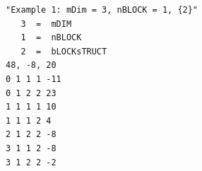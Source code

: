 \begin{center}
\begin{minipage}{0.72\textwidth}
\begin{verbatim}
"Example 1: mDim = 3, nBLOCK = 1, {2}"
   3  =  mDIM
   1  =  nBLOCK
   2  =  bLOCKsTRUCT
48, -8, 20
0 1 1 1 -11
0 1 2 2 23
1 1 1 1 10
1 1 1 2 4
2 1 2 2 -8
3 1 1 2 -8
3 1 2 2 -2
\end{verbatim}
\end{minipage}
\end{center}
